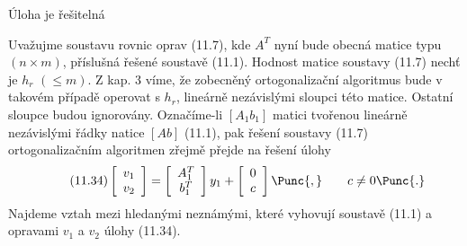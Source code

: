  Úloha je řešitelná

Uvažujme soustavu rovnic oprav (11.7), kde $A^T$ nyní bude
obecná matice typu $(n \times m)$, příslušná řešené soustavě (11.1).
Hodnost matice soustavy (11.7) nechť je $h_r$ $(\le m)$. Z kap. 3 víme,
že zobecněný ortogonalizační algoritmus bude v takovém případě
operovat s $h_r$, lineárně nezávislými sloupci této matice.
Ostatní sloupce budou ignorovány. Označíme-li $[A_1 b_1]$ matici
tvořenou lineárně nezávislými řádky natice $[A b]$ (11.1), pak
řešení soustavy (11.7) ortogonalizačním algoritmen zřejmě
přejde na řešení úlohy
%
\begin{align*}
  \tag{11.34}
  \left[
    \begin{array}{c}
      v_1 \\ v_2
    \end{array}\right] =
  \left[
    \begin{array}{c}
      A_1^T \\ b_1^T
    \end{array}\right] y_1 +
  \left[
    \begin{array}{c}
      0 \\ c
    \end{array}\right]\Punc{,} \qquad c \ne 0 \Punc{.}
\end{align*}
%
Najdeme vztah mezi hledanými neznámými, které vyhovují
soustavě (11.1) a opravami $v_1$ a $v_2$ úlohy (11.34).


